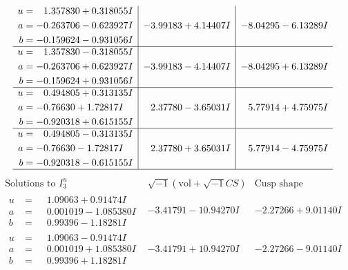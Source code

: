 \documentclass[1p]{elsarticle_modified}
\theoremstyle{definition}
\newcommand{\I}{\sqrt{-1}}
\begin{document}
$$\begin{array}{c|c|c}
\begin{aligned}
u &= \phantom{-}1.357830 + 0.318055 I \\
a &= -0.263706 - 0.623927 I \\
b &= -0.159624 - 0.931056 I\end{aligned}
 & -3.99183 + 4.14407 I & -8.04295 - 6.13289 I \\ \hline\begin{aligned}
u &= \phantom{-}1.357830 - 0.318055 I \\
a &= -0.263706 + 0.623927 I \\
b &= -0.159624 + 0.931056 I\end{aligned}
 & -3.99183 - 4.14407 I & -8.04295 + 6.13289 I \\ \hline\begin{aligned}
u &= \phantom{-}0.494805 + 0.313135 I \\
a &= -0.76630 + 1.72817 I \\
b &= -0.920318 + 0.615155 I\end{aligned}
 & \phantom{-}2.37780 - 3.65031 I & \phantom{-}5.77914 + 4.75975 I \\ \hline\begin{aligned}
u &= \phantom{-}0.494805 - 0.313135 I \\
a &= -0.76630 - 1.72817 I \\
b &= -0.920318 - 0.615155 I\end{aligned}
 & \phantom{-}2.37780 + 3.65031 I & \phantom{-}5.77914 - 4.75975 I\\
 \hline 
 \end{array}$$\newpage$$\begin{array}{c|c|c}  
\text{Solutions to }I^u_{3}& \I (\text{vol} + \sqrt{-1}CS) & \text{Cusp shape}\\
 \hline 
\begin{aligned}
u &= \phantom{-}1.09063 + 0.91474 I \\
a &= \phantom{-}0.001019 - 1.085380 I \\
b &= \phantom{-}0.99396 - 1.18281 I\end{aligned}
 & -3.41791 - 10.94270 I & -2.27266 + 9.01140 I \\ \hline\begin{aligned}
u &= \phantom{-}1.09063 - 0.91474 I \\
a &= \phantom{-}0.001019 + 1.085380 I \\
b &= \phantom{-}0.99396 + 1.18281 I\end{aligned}
 & -3.41791 + 10.94270 I & -2.27266 - 9.01140 I \\ \hline\begin{aligned}

\end{aligned}
\end{array}$$
\end{document}
